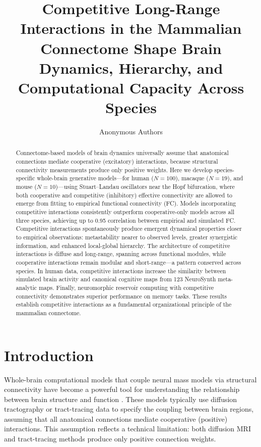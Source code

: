 \documentclass[11pt]{article}
\title{Competitive Long-Range Interactions in the Mammalian Connectome Shape Brain Dynamics, Hierarchy, and Computational Capacity Across Species}
\author{Anonymous Authors}
\date{}
\begin{document}
\maketitle

\begin{abstract}
Connectome-based models of brain dynamics universally assume that anatomical connections mediate cooperative (excitatory) interactions, because structural connectivity measurements produce only positive weights. Here we develop species-specific whole-brain generative models---for human ($N=100$), macaque ($N=19$), and mouse ($N=10$)---using Stuart--Landau oscillators near the Hopf bifurcation, where both cooperative and competitive (inhibitory) effective connectivity are allowed to emerge from fitting to empirical functional connectivity (FC). Models incorporating competitive interactions consistently outperform cooperative-only models across all three species, achieving up to 0.95 correlation between empirical and simulated FC. Competitive interactions spontaneously produce emergent dynamical properties closer to empirical observations: metastability nearer to observed levels, greater synergistic information, and enhanced local-global hierarchy. The architecture of competitive interactions is diffuse and long-range, spanning across functional modules, while cooperative interactions remain modular and short-range---a pattern conserved across species. In human data, competitive interactions increase the similarity between simulated brain activity and canonical cognitive maps from 123 NeuroSynth meta-analytic maps. Finally, neuromorphic reservoir computing with competitive connectivity demonstrates superior performance on memory tasks. These results establish competitive interactions as a fundamental organizational principle of the mammalian connectome.
\end{abstract}

\section{Introduction}

Whole-brain computational models that couple neural mass models via structural connectivity have become a powerful tool for understanding the relationship between brain structure and function \citep{deco2017dynamics}. These models typically use diffusion tractography or tract-tracing data to specify the coupling between brain regions, assuming that all anatomical connections mediate cooperative (positive) interactions. This assumption reflects a technical limitation: both diffusion MRI and tract-tracing methods produce only positive connection weights.
\end{document}
